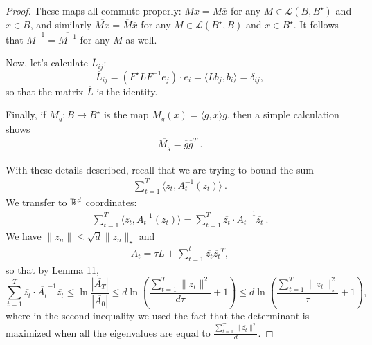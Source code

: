 \documentclass[12pt]{colt2018} %
\begin{document}
\begin{proof}
These maps all commute properly: $\overline{Mx} = \overline{M}\overline{x}$ for any $M\in \mathcal{L}(B,B^\star)$ and $x\in B$, and similarly $\overline{Mx}=\overline{M}\overline{x}$ for any $M\in\mathcal{L}(B^\star, B)$ and $x\in B^\star$. It follows that $\overline{M}^{-1}=\overline{M^{-1}}$ for any $M$ as well.

Now, let's calculate $\overline{L}_{ij}$:
\[
\overline{L}_{ij} = (F^\star LF^{-1} e_j)\cdot e_i
=\langle L b_j,b_i\rangle
=\delta_{ij},
\]
so that the matrix $\overline{L}$ is the identity.

Finally, if $M_g:B\to B^\star$ is the map $M_g(x) = \langle g, x\rangle g$, then a simple calculation shows
\begin{align*}
\overline{M_g} =\overline{g}\overline{g}^T~.
\end{align*}

With these details described, recall that we are trying to bound the sum
\begin{align*}
\sum_{t=1}^T \langle z_t,  A^{-1}_{t}(z_t)\rangle~.
\end{align*}
We transfer to $\mathbb{R}^d$ coordinates:
\begin{align*}
\sum_{t=1}^T \langle z_t,  A^{-1}_{t}(z_t)\rangle=\sum_{t=1}^T  \overline{z_t}\cdot \overline{A_t}^{-1}\overline{z_t}~.
\end{align*}
We have $\|\overline{z_n}\|\le \sqrt{d}\|z_n\|_\star$ and
\begin{align*}
\overline{A_t}=\tau \overline{L} + \sum_{t=1}^t \overline{z_t}\overline{z_t}^T,
\end{align*}
so that by \citep{hazan2007logarithmic} Lemma 11,
\[
\sum_{t=1}^T  \overline{z_t}\cdot \overline{A_t}^{-1}\overline{z_t}
\le \ln \frac{|\overline{A_T}|}{|\overline{A_0}|} 
\leq d \ln \left(\frac{\sum_{t=1}^T \|\overline{z_t}\|^2}{d \tau} +1\right)
\leq d \ln \left(\frac{\sum_{t=1}^T \|z_t\|_\star ^2}{\tau} +1\right),
\]
where in the second inequality we used the fact that the determinant is maximized when all the eigenvalues are equal to $ \frac{\sum_{t=1}^T \|\overline{z_t}\|^2}{d}$.
\end{proof}
\end{document}
